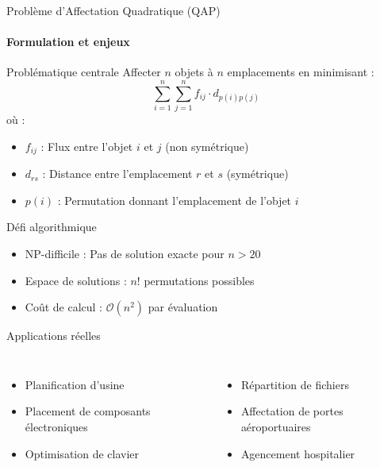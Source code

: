 \documentclass{beamer}
\begin{document}
\begin{frame}{Problème d'Affectation Quadratique (QAP)}
    \framesubtitle{Formulation et enjeux}

    \begin{block}{Problématique centrale}
        Affecter \( n \) objets à \( n \) emplacements en minimisant :
        \[
            \sum_{i=1}^n \sum_{j=1}^n f_{ij} \cdot d_{p(i)p(j)}
        \]
        où :
        \begin{itemize}
            \item \( f_{ij} \) : Flux entre l'objet \( i \) et \( j \) (non symétrique)
            \item \( d_{rs} \) : Distance entre l'emplacement \( r \) et \( s \) (symétrique)
            \item \( p(i) \) : Permutation donnant l'emplacement de l'objet \( i \)
        \end{itemize}
    \end{block}

    \begin{exampleblock}{Défi algorithmique}
        \begin{itemize}
            \item NP-difficile : Pas de solution exacte pour \( n > 20 \)
            \item Espace de solutions : \( n! \) permutations possibles
            \item Coût de calcul : \( \mathcal{O}(n^2) \) par évaluation
        \end{itemize}
    \end{exampleblock}

    \begin{alertblock}{Applications réelles}
        \begin{columns}
            \begin{itemize}
                \item Planification d'usine
                \item Placement de composants électroniques
                \item Optimisation de clavier
            \end{itemize}

            \begin{itemize}
                \item Répartition de fichiers
                \item Affectation de portes aéroportuaires
                \item Agencement hospitalier
            \end{itemize}
        \end{columns}
    \end{alertblock}
\end{frame}
\end{document}
